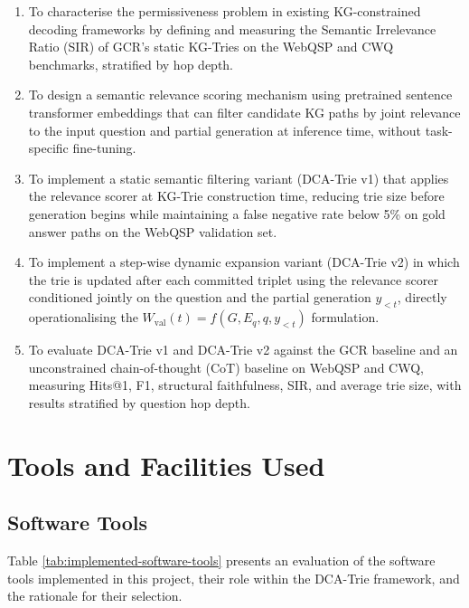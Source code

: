 \begin{enumerate}[label=\roman*.]
	\item To characterise the permissiveness problem in existing KG-constrained decoding frameworks by defining and measuring the Semantic Irrelevance Ratio (SIR) of GCR's static KG-Tries on the WebQSP and CWQ benchmarks, stratified by hop depth.
	\item To design a semantic relevance scoring mechanism using pretrained sentence transformer embeddings \citep{reimers2019sentence} that can filter candidate KG paths by joint relevance to the input question and partial generation at inference time, without task-specific fine-tuning.
	\item To implement a static semantic filtering variant (DCA-Trie v1) that applies the relevance scorer at KG-Trie construction time, reducing trie size before generation begins while maintaining a false negative rate below 5\% on gold answer paths on the WebQSP validation set.
	\item To implement a step-wise dynamic expansion variant (DCA-Trie v2) in which the trie is updated after each committed triplet using the relevance scorer conditioned jointly on the question and the partial generation $y_{<t}$, directly operationalising the $W_{\mathrm{val}}(t) = f(G, E_q, q, y_{<t})$ formulation.
	\item To evaluate DCA-Trie v1 and DCA-Trie v2 against the GCR baseline \citep{luo2024gcr} and an unconstrained chain-of-thought (CoT) baseline \citep{wei2022cot} on WebQSP and CWQ, measuring Hits@1, F1, structural faithfulness, SIR, and average trie size, with results stratified by question hop depth.
\end{enumerate}

\section{Tools and Facilities Used}

\subsection{Software Tools}

Table \ref{tab:implemented-software-tools} presents an evaluation of the software tools implemented in this project, their role within the DCA-Trie framework, and the rationale for their selection.

